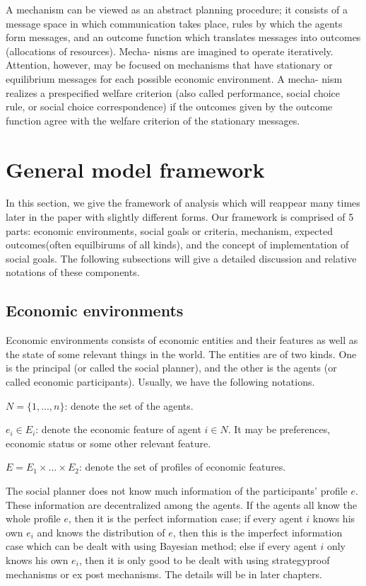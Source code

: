 A mechanism can be viewed as an abstract planning procedure; it consists of a message
space in which communication takes place, rules by which the agents form messages, and an
outcome function which translates messages into outcomes (allocations of resources). Mecha-
nisms are imagined to operate iteratively. Attention, however, may be focused on mechanisms
that have stationary or equilibrium messages for each possible economic environment. A mecha-
nism realizes a prespecified welfare criterion (also called performance, social choice rule, or social
choice correspondence) if the outcomes given by the outcome function agree with the welfare
criterion of the stationary messages. 

\section{General model framework}
 In this section, we give the framework of analysis which will
 reappear many times later in the paper with slightly different
 forms. Our framework is comprised of 5 parts: 
 economic environments, social goals or criteria,  mechanism, 
expected outcomes(often equilbirums of all kinds), and the concept of
implementation of social goals.
The following subsections will give a detailed discussion and relative
notations of these components.
\subsection{Economic environments}
Economic environments consists of economic entities and their features
as well as the state of some relevant things in the world. The
entities are of two kinds. One is the principal (or called the social
planner),  and the other is  the agents (or called economic
participants).  Usually, we have the following notations.

$N=\{1,...,n\}$: denote the set of the agents.

$e_i\in E_i$: denote the economic feature of agent $i\in N$. It may be preferences, economic status or some other relevant feature.

$E=E_1\times \dots \times E_2$: denote the set of profiles of economic features.

 The social planner does not know much information of
the participants' profile $e$. These information are decentralized
among the agents. 
If the agents all know the whole profile $e$, then it is the perfect information case; if every agent $i$ knows his own $e_i$ and knows the distribution of $e$, then this is the imperfect information case which can be dealt with using Bayesian method; else if every agent $i$ only knows his own $e_i$, then it is only good to be dealt with using strategyproof mechanisms or ex post mechanisms. The details will be in later chapters.


